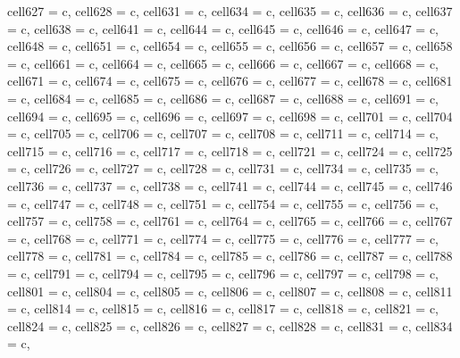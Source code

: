 {\begin{longtblr}[
  label = none,
  entry = none,
]
{  cell{62}{7} = {c},
  cell{62}{8} = {c},
  cell{63}{1} = {c},
  cell{63}{4} = {c},
  cell{63}{5} = {c},
  cell{63}{6} = {c},
  cell{63}{7} = {c},
  cell{63}{8} = {c},
  cell{64}{1} = {c},
  cell{64}{4} = {c},
  cell{64}{5} = {c},
  cell{64}{6} = {c},
  cell{64}{7} = {c},
  cell{64}{8} = {c},
  cell{65}{1} = {c},
  cell{65}{4} = {c},
  cell{65}{5} = {c},
  cell{65}{6} = {c},
  cell{65}{7} = {c},
  cell{65}{8} = {c},
  cell{66}{1} = {c},
  cell{66}{4} = {c},
  cell{66}{5} = {c},
  cell{66}{6} = {c},
  cell{66}{7} = {c},
  cell{66}{8} = {c},
  cell{67}{1} = {c},
  cell{67}{4} = {c},
  cell{67}{5} = {c},
  cell{67}{6} = {c},
  cell{67}{7} = {c},
  cell{67}{8} = {c},
  cell{68}{1} = {c},
  cell{68}{4} = {c},
  cell{68}{5} = {c},
  cell{68}{6} = {c},
  cell{68}{7} = {c},
  cell{68}{8} = {c},
  cell{69}{1} = {c},
  cell{69}{4} = {c},
  cell{69}{5} = {c},
  cell{69}{6} = {c},
  cell{69}{7} = {c},
  cell{69}{8} = {c},
  cell{70}{1} = {c},
  cell{70}{4} = {c},
  cell{70}{5} = {c},
  cell{70}{6} = {c},
  cell{70}{7} = {c},
  cell{70}{8} = {c},
  cell{71}{1} = {c},
  cell{71}{4} = {c},
  cell{71}{5} = {c},
  cell{71}{6} = {c},
  cell{71}{7} = {c},
  cell{71}{8} = {c},
  cell{72}{1} = {c},
  cell{72}{4} = {c},
  cell{72}{5} = {c},
  cell{72}{6} = {c},
  cell{72}{7} = {c},
  cell{72}{8} = {c},
  cell{73}{1} = {c},
  cell{73}{4} = {c},
  cell{73}{5} = {c},
  cell{73}{6} = {c},
  cell{73}{7} = {c},
  cell{73}{8} = {c},
  cell{74}{1} = {c},
  cell{74}{4} = {c},
  cell{74}{5} = {c},
  cell{74}{6} = {c},
  cell{74}{7} = {c},
  cell{74}{8} = {c},
  cell{75}{1} = {c},
  cell{75}{4} = {c},
  cell{75}{5} = {c},
  cell{75}{6} = {c},
  cell{75}{7} = {c},
  cell{75}{8} = {c},
  cell{76}{1} = {c},
  cell{76}{4} = {c},
  cell{76}{5} = {c},
  cell{76}{6} = {c},
  cell{76}{7} = {c},
  cell{76}{8} = {c},
  cell{77}{1} = {c},
  cell{77}{4} = {c},
  cell{77}{5} = {c},
  cell{77}{6} = {c},
  cell{77}{7} = {c},
  cell{77}{8} = {c},
  cell{78}{1} = {c},
  cell{78}{4} = {c},
  cell{78}{5} = {c},
  cell{78}{6} = {c},
  cell{78}{7} = {c},
  cell{78}{8} = {c},
  cell{79}{1} = {c},
  cell{79}{4} = {c},
  cell{79}{5} = {c},
  cell{79}{6} = {c},
  cell{79}{7} = {c},
  cell{79}{8} = {c},
  cell{80}{1} = {c},
  cell{80}{4} = {c},
  cell{80}{5} = {c},
  cell{80}{6} = {c},
  cell{80}{7} = {c},
  cell{80}{8} = {c},
  cell{81}{1} = {c},
  cell{81}{4} = {c},
  cell{81}{5} = {c},
  cell{81}{6} = {c},
  cell{81}{7} = {c},
  cell{81}{8} = {c},
  cell{82}{1} = {c},
  cell{82}{4} = {c},
  cell{82}{5} = {c},
  cell{82}{6} = {c},
  cell{82}{7} = {c},
  cell{82}{8} = {c},
  cell{83}{1} = {c},
  cell{83}{4} = {c},
}
\end{longtblr}}
